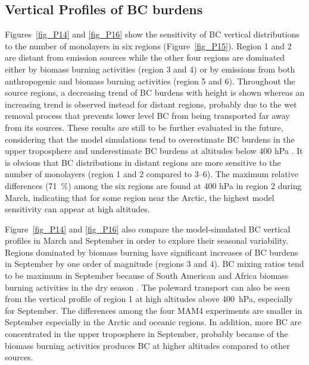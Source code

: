 \documentclass[12pt, fullpage]{uiucthesis2009_2}
\begin{document}
	\subsection{Vertical Profiles of BC burdens}\label{sec_8}
	Figures~\ref{fig_P14} and \ref{fig_P16} show the sensitivity of BC vertical distributions to the number of monolayers in six regions (Figure~\ref{fig_P15}). Region 1 and 2 are distant from emission sources while the other four regions are dominated either by biomass burning activities (region 3 and 4) or by emissions from both anthropogenic and biomass burning activities (region 5 and 6). Throughout the source regions, a decreasing trend of BC burdens with height is shown whereas an increasing trend is observed instead for distant regions, probably due to the wet removal process that prevents lower level BC from being transported far away from its sources. These results are still to be further evaluated in the future, considering that the model simulations tend to overestimate BC burdens in the upper troposphere and underestimate BC burdens at altitudes below 400 hPa \citep{Liu2016}. It is obvious that BC distributions in distant regions are more sensitive to the number of monolayers (region 1 and 2 compared to 3--6). The maximum relative differences (71~$\%$) among the six regions are found at 400 hPa in region 2 during March, indicating that for some region near the Arctic, the highest model sensitivity can appear at high altitudes. 
	
	Figure~\ref{fig_P14} and \ref{fig_P16} also compare the model-simulated BC vertical profiles in March and September in order to explore their seasonal variability. Regions dominated by biomass burning have significant increases of BC burdens in September by one order of magnitude (regions 3 and 4). BC mixing ratios tend to be maximum in September because of South American and Africa biomass burning activities in the dry season \citep{Liu2016}. The poleward transport can also be seen from the vertical profile of region 1 at high altitudes above 400~hPa, especially for September. The differences among the four MAM4 experiments are smaller in September especially in the Arctic and oceanic regions. In addition, more BC are concentrated in the upper troposphere in September, probably because of the biomass burning activities produces BC at higher altitudes compared to other sources. 
	
\end{document}
